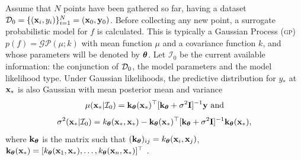 \documentclass[twoside]{article}
\newcommand{\I}{\mathcal{I}}
\newcommand{\acr}[1]{\textsc{#1}\xspace}
\newcommand{\gp}{\acr{gp}}
\begin{document}
Assume that $N$ points have been gathered so far, having a dataset $\mathcal{D}_0 = \{(\mathbf{x}_i,y_i)\}_{i=1}^N = (\mathbf{\relax{x}}_0,\mathbf{y}_0)$. Before collecting any new point, a surrogate probabilistic model for $f$ is calculated. This is typically a Gaussian Process (\gp) $p(f) = \mathcal{GP}(\mu; k)$ with mean function $\mu$ and a covariance function $k$, and whose parameters will be denoted by $\boldsymbol{\theta}$.  Let $\I_0$ be the current available information: the conjunction of $\mathcal{D}_0$, the model parameters and the model likelihood type.  Under Gaussian likelihoods, the predictive distribution for $y_*$ at $\mathbf{x}_*$ is also Gaussian with mean posterior mean and variance
$$\mu(\latentVector_{*}|\I_0) = \kernelVector_{\parameterVector}(\latentMatrix_*)^\top[\kernelVector_{\parameterVector} + \sigma^2 \textbf{I}]^{-1}\dataVector \mbox{ and}$$
$$\sigma^2(\latentVector_*|\I_0)=k_{\parameterVector}(\latentVector_*,\latentVector_*)-\kernelVector_{\parameterVector}(\latentVector_*)^\top[\kernelMatrix_{\parameterVector}+\sigma^2 \textbf{I}]^{-1}\kernelVector_{\parameterVector}(\latentVector_*),$$
where $\mathbf{\relax{k}}_{\boldsymbol{\theta}}$ is the matrix such that $(\mathbf{\relax{k}}_{\boldsymbol{\theta}})_{ij}=k_{\boldsymbol{\theta}}(\mathbf{x}_i,\mathbf{x}_j)$,  $\mathbf{k}_{\boldsymbol{\theta}}(\mathbf{x}_{*}) = [k_{\boldsymbol{\theta}}(\mathbf{x}_1,\mathbf{x}_{*}),\dots,k_{\boldsymbol{\theta}}(\mathbf{x}_n,\mathbf{x}_{*})]^\top$ \citep{Rasmussen:2005:GPM:1162254}.  
\end{document}
